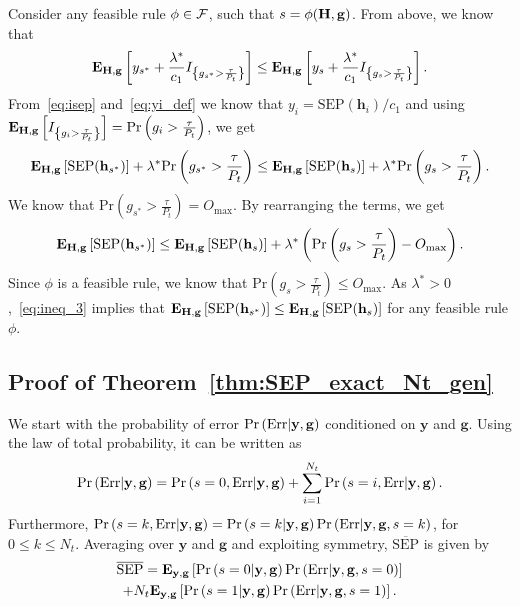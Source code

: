 \documentclass[12pt,draftcls,peerreview,onecolumn]{IEEEtran}
\newcommand{\brac}[1]{\left({#1}\right)}
\newcommand{\cbrac}[1]{\left\{{#1}\right\}}
\newcommand{\indic}[1]{I_{\cbrac{#1}}}
\newcommand{\mtx}[1]{{\bf #1}} %
\newcommand{\explow}[2]{{\bf{E}}_{#1}\left[{#2}\right]}
\newcommand{\prob}[1]{\text{Pr}\brac{#1}}
\newcommand{\given}{\arrowvert}
\newcommand{\SEP}{\text{SEP}}
\newcommand{\y}{\mathbf{y}}
\newcommand{\nx}{{0}}
\newcommand{\lam}{\lambda}
\newcommand{\lamstar}{\lam^{*}}
\newcommand{\sstar}{s^{*}}
\newcommand{\Err}{{\text{Err}}}
\newcommand{\F}{\cal{F}}
\newcommand{\Nt}{{N_t}}
\newcommand{\Pt}{{P_t}}
\newcommand{\such}{h}
\newcommand{\puch}{g}
\newcommand{\gk}[1]{{\puch_{#1}}}
\newcommand{\g}{\mathbf{\puch}}
\newcommand{\outmax}{O_{\text{max}}}
\newcommand{\itau}{\tau}
\newcommand{\cone}{c_{1}}
\newcommand{\taubypt}{\frac{\itau}{\Pt}}
\newcommand{\gkgrtaubypt}[1]{{\gk{#1}}>\taubypt}
\newcommand{\gindic}[1]{\indic{\gkgrtaubypt{#1}}}
\newcommand{\yk}[1]{y_{#1}}
\newcommand{\asrule}{\phi}
\newcommand{\Hmx}{\mtx{H}}
\newcommand{\callamstarrule}{\cal S_{\lam^{*}}}
\newcommand{\avgSEP}{\overline{\SEP}}
\begin{document}
Consider any feasible rule $\asrule\in\F$, such that  $s=\phi(\Hmx,\g)$. From above, we know that   
\begin{equation}
\label{eq:opt_rul_1}  
   \explow{\Hmx,\g}{\yk{{\sstar}} + \frac{\lamstar}{\cone}\gindic{{\sstar}}} \leq  \explow{\Hmx,\g}{\yk{{s}} + \frac{\lamstar}{\cone}\gindic{{s}}}.
\end{equation}
From~\eqref{eq:isep} and~\eqref{eq:yi_def} we know that $\yk{i}={\SEP(\mathbf{\such}_{i})}/{\cone}$ and using $\explow{\Hmx,\g}{\gindic{i}}=\prob{\gk{i}>\taubypt}$, we get
%
\begin{equation}
\label{eq:opt_rul_2}
   \explow{\Hmx,\g}{\SEP(\hsstar)} + \lamstar  \prob{\gk{\sstar}>\taubypt} \leq  \explow{\Hmx,\g}{\SEP(\hs)} + \lamstar  \prob{\gk{s}>\taubypt}.
\end{equation}
%
We know that $\prob{\gk{\sstar}>\taubypt}=\outmax$. By rearranging the terms, we get
%
\begin{equation}
\label{eq:ineq_3}
\explow{\Hmx,\g}{\SEP(\hsstar)} \leq \explow{\Hmx,\g}{\SEP(\hs)} + \lamstar \left( \prob{\gk{s}>\taubypt} -  \outmax \right).
\end{equation}
%
Since $\phi$ is a feasible rule, we know that $\prob{\gkgrtaubypt{s}}\leq \outmax$. As $\lamstar>0$,~\eqref{eq:ineq_3} implies that $\explow{\Hmx,\g}{\SEP(\hsstar)} \leq \explow{\Hmx,\g}{\SEP(\hs)}$ for any feasible rule $\phi$. %




\subsection{Proof of Theorem~\ref{thm:SEP_exact_Nt_gen}}
\label{proof:SEP_exact_Nt_gen}
We start with the probability of error $\prob{\Err \given \y,\g}$ conditioned on $\y$ and $\g$. Using the law of total probability, it can be written as
%
\begin{equation}
\prob{\Err \given \y,\g} =  \prob{s=\nx,\Err\given\y,\g} + \sum_{i=1}^{\Nt}\prob{s=i,\Err\given\y,\g}.
\label{eq:Perr_all_h}
\end{equation}
%
Furthermore, $\prob{s=k,\Err\given\y,\g}=\prob{s=k\given\y,\g}\prob{\Err\given\y,\g,s=k}$, for $0\leq k \leq \Nt$. Averaging over $\y$ and $\g$ and exploiting symmetry, $\avgSEP$ is given by
\begin{multline}
\label{eq:avg_SEP_1}
 \avgSEP = \explow{\y,\g}{\prob{s=\nx\given\y,\g}\prob{\Err\given\y,\g,s=\nx}} \\+ \Nt\explow{\y,\g}{\prob{s=1\given\y,\g}\prob{\Err\given\y,\g,s=1}}. 
\end{multline}
\end{document}
